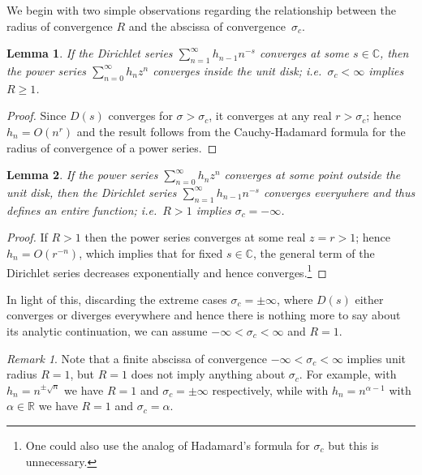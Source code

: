 \documentclass[11pt,a4paper]{amsart}
\newcommand{\R}{\mathbb{R}}
\newcommand{\C}{\mathbb{C}}
\theoremstyle{plain}
\theoremstyle{plain}
\theoremstyle{plain}
\newtheorem{lemma}{Lemma}
\theoremstyle{definition}
\theoremstyle{remark}
\newtheorem*{remark}{Remark}
\begin{document}
We begin with two simple observations regarding the relationship between the radius of convergence $R$ and the abscissa of convergence~$\sigma_{c}$.


\begin{lemma}
\label{lem:sc_finite_R>=1}
If the Dirichlet series $\sum_{n=1}^{\infty} h_{n-1} n^{-s}$ converges at some $s \in \C$, then the power series $\sum_{n=0}^{\infty} h_{n} z^{n}$ converges inside the unit disk; i.e.\ $\sigma_{c} < \infty$ implies $R \geq 1$.
\end{lemma}


\begin{proof}
Since $D(s)$ converges for $\sigma > \sigma_{c}$, it converges at any real $r > \sigma_{c}$; hence $h_{n} = O(n^{r})$ and the result follows from the Cauchy-Hadamard formula for the radius of convergence of a power series.
\end{proof}


\begin{lemma}
\label{lem:R>1_entire}
If the power series $\sum_{n=0}^{\infty} h_{n} z^{n}$ converges at some point outside the unit disk, then the Dirichlet series $\sum_{n=1}^{\infty} h_{n-1} n^{-s}$ converges everywhere and thus defines an entire function; i.e.\ $R > 1$ implies $\sigma_{c} = -\infty$.
\end{lemma}


\begin{proof}
If $R > 1$ then the power series converges at some real $z=r > 1$; hence $h_{n} = O(r^{-n})$, which implies that for fixed $s \in \C$, the general term of the Dirichlet series decreases exponentially and hence converges.\footnote{One could also use the analog of Hadamard's formula for $\sigma_{c}$ but this is unnecessary.}
\end{proof}


In light of this, discarding the extreme cases $\sigma_{c} = \pm\infty$, where $D(s)$ either converges or diverges everywhere and hence there is nothing more to say about its analytic continuation, we can assume $-\infty < \sigma_{c} < \infty$ and $R=1$.


\begin{remark}
Note that a finite abscissa of convergence $-\infty < \sigma_{c} < \infty$ implies unit radius $R = 1$, but $R=1$ does not imply anything about $\sigma_{c}$. For example, with $h_{n} = n^{\pm\sqrt{n}}$ we have $R=1$ and $\sigma_{c} = \pm\infty$ respectively, while with $h_{n} = n^{\alpha - 1}$ with $\alpha \in \R$ we have $R=1$ and $\sigma_{c} = \alpha$.
\end{remark}
\end{document}
